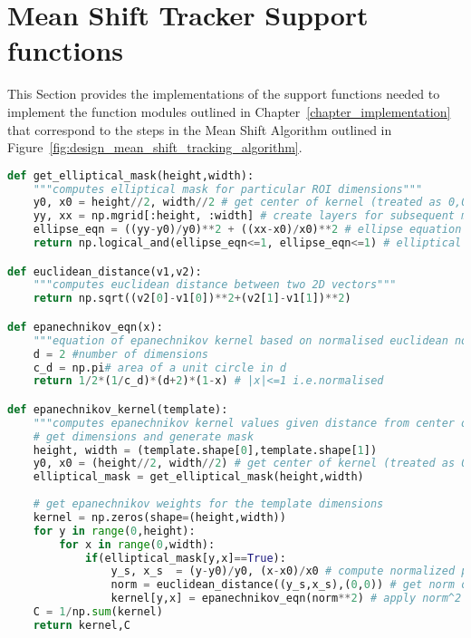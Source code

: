\section{Mean Shift Tracker Support functions}\label{appendix_supportMS}
This Section provides the implementations of the support functions needed to
implement the function modules outlined in Chapter~\ref{chapter_implementation}
that correspond to the steps in the Mean Shift Algorithm outlined in
Figure~\ref{fig:design_mean_shift_tracking_algorithm}.

\begin{lstlisting}[language=Python, caption={Additional functions for Mean Shift Tracker Impementation}, captionpos=b, label={lst:support_MS}]
def get_elliptical_mask(height,width):
    """computes elliptical mask for particular ROI dimensions"""
    y0, x0 = height//2, width//2 # get center of kernel (treated as 0,0) - note these are also hy and hx 
    yy, xx = np.mgrid[:height, :width] # create layers for subsequent mask
    ellipse_eqn = ((yy-y0)/y0)**2 + ((xx-x0)/x0)**2 # ellipse equation
    return np.logical_and(ellipse_eqn<=1, ellipse_eqn<=1) # elliptical mask for kernel

def euclidean_distance(v1,v2):
    """computes euclidean distance between two 2D vectors"""
    return np.sqrt((v2[0]-v1[0])**2+(v2[1]-v1[1])**2)

def epanechnikov_eqn(x):
    """equation of epanechnikov kernel based on normalised euclidean norm squared"""
    d = 2 #number of dimensions
    c_d = np.pi# area of a unit circle in d  
    return 1/2*(1/c_d)*(d+2)*(1-x) # |x|<=1 i.e.normalised

def epanechnikov_kernel(template):
    """computes epanechnikov kernel values given distance from center of kernel"""    
    # get dimensions and generate mask
    height, width = (template.shape[0],template.shape[1])
    y0, x0 = (height//2, width//2) # get center of kernel (treated as 0,0) - note these are also hy and hx 
    elliptical_mask = get_elliptical_mask(height,width) 
    
    # get epanechnikov weights for the template dimensions
    kernel = np.zeros(shape=(height,width)) 
    for y in range(0,height):
        for x in range(0,width):
            if(elliptical_mask[y,x]==True):
                y_s, x_s  = (y-y0)/y0, (x-x0)/x0 # compute normalized point 
                norm = euclidean_distance((y_s,x_s),(0,0)) # get norm of normalized point (x_i*) i.e y0=hy, x0=hx
                kernel[y,x] = epanechnikov_eqn(norm**2) # apply norm^2 to epanechnikov equation
    C = 1/np.sum(kernel)
    return kernel,C
\end{lstlisting}

